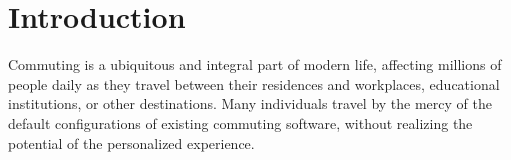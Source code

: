 \chapter{Introduction}\label{ch:introduction}

Commuting is a ubiquitous and integral part of modern life, affecting millions of people daily as they travel between
their residences and workplaces, educational institutions, or other destinations.
Many individuals travel by the mercy of the default configurations of existing commuting software, without realizing the
potential of the personalized experience.
